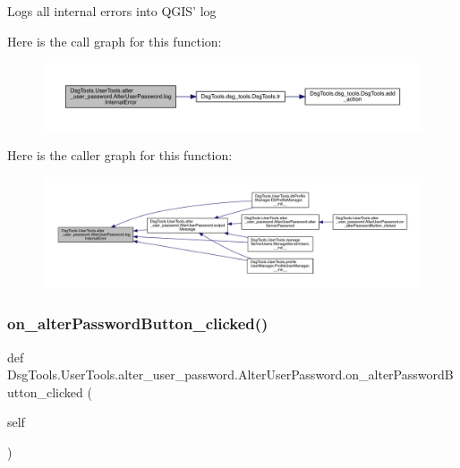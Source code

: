 \begin{DoxyVerb}Logs all internal errors into QGIS' log
\end{DoxyVerb}
 Here is the call graph for this function\+:
\nopagebreak
\begin{figure}[H]
\begin{center}
\leavevmode
\includegraphics[width=350pt]{class_dsg_tools_1_1_user_tools_1_1alter__user__password_1_1_alter_user_password_a364b941d46c8a291892bebbd1f462263_cgraph}
\end{center}
\end{figure}
Here is the caller graph for this function\+:
\nopagebreak
\begin{figure}[H]
\begin{center}
\leavevmode
\includegraphics[width=350pt]{class_dsg_tools_1_1_user_tools_1_1alter__user__password_1_1_alter_user_password_a364b941d46c8a291892bebbd1f462263_icgraph}
\end{center}
\end{figure}
\mbox{\label{class_dsg_tools_1_1_user_tools_1_1alter__user__password_1_1_alter_user_password_a66ccfc8ce9d82457b05debdc463af7b4}} 
\subsubsection{\texorpdfstring{on\+\_\+alter\+Password\+Button\+\_\+clicked()}{on\_alterPasswordButton\_clicked()}}
{\footnotesize\ttfamily def Dsg\+Tools.\+User\+Tools.\+alter\+\_\+user\+\_\+password.\+Alter\+User\+Password.\+on\+\_\+alter\+Password\+Button\+\_\+clicked (\begin{DoxyParamCaption}\item[{}]{self }\end{DoxyParamCaption})}

